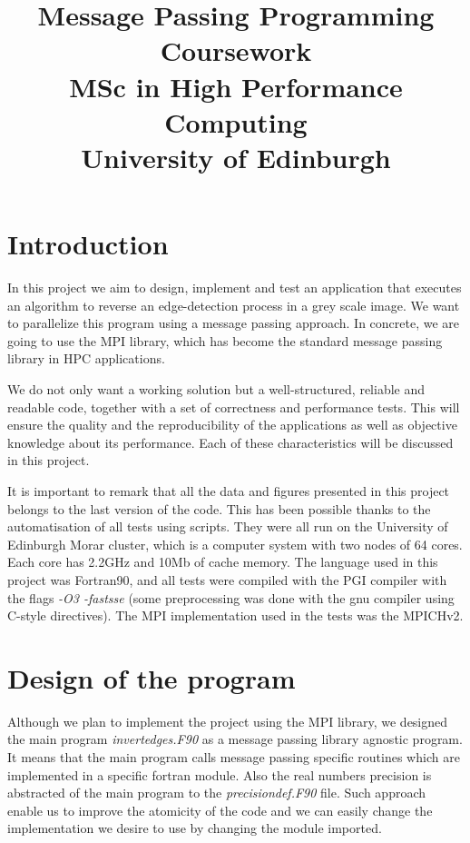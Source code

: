 \documentclass[12pt, a4paper, oneside]{article}
\author{}
\title{
  \textbf{Message Passing Programming Coursework}\\
  MSc in High Performance Computing\\
  University of Edinburgh
}
\begin{document}
    \thispagestyle{empty}
	\maketitle
    \vspace{2cm}
    \tableofcontents
	\newpage


\section{Introduction}
In this project we aim to design, implement and test an application that executes an algorithm to reverse an edge-detection process in a grey scale image.
We want to parallelize this program using a message passing approach.
In concrete, we are going to use the MPI library, which has become the standard message passing library in HPC applications.

We do not only want a working solution but a well-structured, reliable and readable code, together with a set of correctness and performance tests. 
This will ensure the quality and the reproducibility of the applications as well as objective knowledge about its performance.
Each of these characteristics will be discussed in this project.

It is important to remark that all the data and figures presented in this project belongs to the last version of the code.
This has been possible thanks to the automatisation of all tests using scripts.
They were all run on the University of Edinburgh Morar cluster, which is a computer system with two nodes of 64 cores.
Each core has 2.2GHz and 10Mb of cache memory.
The language used in this project was Fortran90, and all tests were compiled with the PGI compiler with the flags \emph{-O3 -fastsse}
(some preprocessing was done with the gnu compiler using C-style directives).
The MPI implementation used in the tests was the MPICHv2.


\section{Design of the program }

Although we plan to implement the project using the MPI library, we designed the main program \emph{invertedges.F90} as a message passing library agnostic program.
It means that the main program calls message passing specific routines which are implemented in a specific fortran module.
Also the real numbers precision is abstracted of the main program to the \emph{precisiondef.F90} file.
Such approach enable us to improve the atomicity of the code and we can easily change the implementation we desire to use by changing the module imported.
\end{document}
